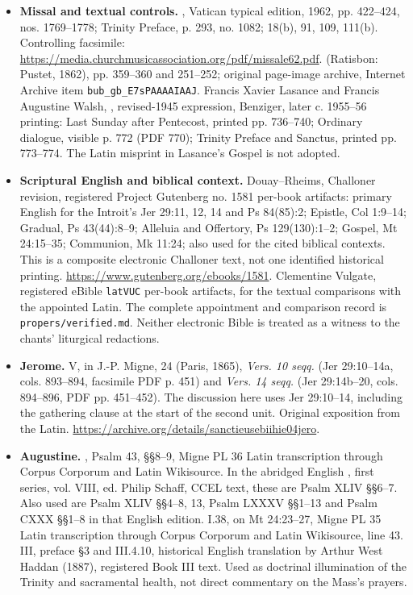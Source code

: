 \begin{itemize}
\item \textbf{Missal and textual controls.}
, Vatican typical edition, 1962, pp. 422--424,
nos. 1769--1778; Trinity Preface, p. 293, no. 1082;
 18(b), 91, 109, 111(b).
Controlling facsimile:
\url{https://media.churchmusicassociation.org/pdf/missale62.pdf}.
 (Ratisbon: Pustet, 1862), pp. 359--360
and 251--252; original page-image archive, Internet Archive item
\texttt{bub\_gb\_E7sPAAAAIAAJ}.
Francis Xavier Lasance and Francis Augustine Walsh,
, revised-1945 expression, Benziger,
later c. 1955--56 printing: Last Sunday after Pentecost,
printed pp. 736--740; Ordinary dialogue, visible p. 772
(PDF 770); Trinity Preface and Sanctus, printed pp. 773--774.
The Latin misprint in Lasance's Gospel is not adopted.

\item \textbf{Scriptural English and biblical context.}
Douay--Rheims, Challoner revision, registered Project Gutenberg
no. 1581 per-book artifacts: primary English for the Introit's
Jer 29:11, 12, 14 and Ps 84(85):2; Epistle, Col 1:9--14;
Gradual, Ps 43(44):8--9; Alleluia and Offertory, Ps 129(130):1--2;
Gospel, Mt 24:15--35; Communion, Mk 11:24; also used for the
cited biblical contexts. This is a composite electronic Challoner
text, not one identified historical printing.
\url{https://www.gutenberg.org/ebooks/1581}.
Clementine Vulgate, registered
eBible \texttt{latVUC} per-book artifacts, for the textual
comparisons with the appointed Latin. The complete appointment
and comparison record is \texttt{propers/verified.md}.
Neither electronic Bible is treated as a witness to the
chants' liturgical redactions.

\item \textbf{Jerome.}
 V, in J.-P. Migne,
 24 (Paris, 1865), \textit{Vers. 10 seqq.}
(Jer 29:10--14a, cols. 893--894, facsimile PDF p. 451) and
\textit{Vers. 14 seqq.} (Jer 29:14b--20, cols. 894--896,
PDF pp. 451--452). The discussion here uses Jer 29:10--14,
including the gathering clause at the start of the second unit.
Original exposition from the Latin.
\url{https://archive.org/details/sanctieusebiihie04jero}.

\item \textbf{Augustine.}
, Psalm 43, §§8--9,
Migne PL 36 Latin transcription through Corpus Corporum and Latin
Wikisource. In the abridged English
, first series, vol. VIII,
ed. Philip Schaff, CCEL text, these are Psalm XLIV §§6--7.
Also used are Psalm XLIV §§4--8, 13, Psalm LXXXV §§1--13 and
Psalm CXXX §§1--8 in that English edition.
 I.38, on Mt 24:23--27,
Migne PL 35 Latin transcription through Corpus Corporum
and Latin Wikisource, line 43.
 III, preface §3 and III.4.10, historical English
translation by Arthur West Haddan (1887), registered
Book III text. Used as doctrinal illumination of the
Trinity and sacramental health, not direct commentary
on the Mass's prayers.


\end{itemize}

